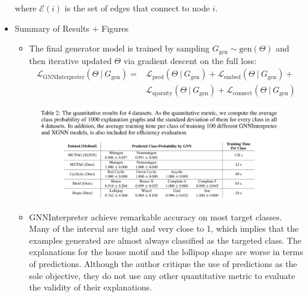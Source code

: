 \documentclass[
  11pt,
  letterpaper,
]{article}
\providecommand{\tightlist}{%
  \setlength{\itemsep}{0pt}\setlength{\parskip}{0pt}}\usepackage{longtable,booktabs,array}
\begin{document}
\begin{itemize}
  where \(\mathcal{E}(i)\) is the set of edges that connect to node
  \(i\).
\item
  Summary of Results + Figures

  \begin{itemize}
  \tightlist
  \item
    The final generator model is trained by sampling
    \(G_\text{gen} \sim \text{gen}(\Theta)\) and then iterative updated
    \(\Theta\) via gradient descent on the full loss: \begin{equation}
      \begin{split}
          \mathcal{L}_{\text{GNNInterpreter}}(\Theta \ | \ G_\text{gen}) = 
          &\mathcal{L}_{\text{pred}}(\Theta \ | \ G_\text{gen}) + 
          \mathcal{L}_{\text{embed}}(\Theta \ | \ G_\text{gen}) +  \\
          &\mathcal{L}_{\text{sparsity}}(\Theta \ | \ G_\text{gen}) +
          \mathcal{L}_{\text{connect}}(\Theta \ | \ G_\text{gen}) 
      \end{split}
      \end{equation}
  \end{itemize}

  \begin{figure}

  {\centering \includegraphics{figures/GNNInt_prediction_results.png}

  }

  \end{figure}

  \begin{itemize}
  \tightlist
  \item
    GNNInterpreter achieve remarkable accuracy on most target classes.
    Many of the interval are tight and very close to 1, which implies
    that the examples generated are almost always classified as the
    targeted class. The explanations for the house motif and the
    lollipop shape are worse in terms of predictions. Although the
    author critique the use of predictions as the sole objective, they
    do not use any other quantitative metric to evaluate the validity of
    their explanations.
  \end{itemize}


\end{itemize}
\end{document}
